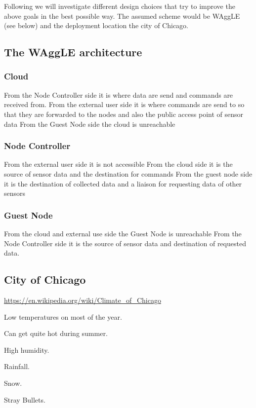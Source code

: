 Following we will investigate different design choices that try to improve the above goals in the best possible way. The assumed scheme would be WAggLE (see below) and the deployment location the city of Chicago.

\subsection{The WAggLE architecture}

\subsubsection{Cloud}

From the Node Controller side it is where data are send and commands are received from.
From the external user side it is where commands are send to so that they are forwarded to the nodes and also the public access point of sensor data
From the Guest Node side the cloud is unreachable

\subsubsection{Node Controller}

From the external user side it is not accessible
From the cloud side it is the source of sensor data and the destination for commands
From the guest node side it is the destination of collected data and a liaison for requesting data of other sensors


\subsubsection{Guest Node}

From the cloud and external use side the Guest Node is unreachable
From the Node Controller side it is the source of sensor data and destination of requested data.


\subsection{City of Chicago}

\url{https://en.wikipedia.org/wiki/Climate_of_Chicago}

Low temperatures on most of the year.

Can get quite hot during summer.

High humidity.

Rainfall.

Snow.

Stray Bullets.
